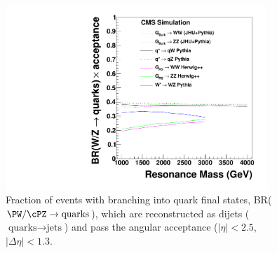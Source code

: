 
\begin{figure}[htb]
\begin{center}
\includegraphics[width=0.88\textwidth]{figs/signal-acc-eff/all-signal-acc-8TeV.pdf}
\end{center}
\caption{Fraction of events with branching into quark final states, BR($\PW/\cPZ \to \text{quarks}$),
  which are reconstructed as dijets ($\text{quarks} \to \text{jets}$)
  and pass the angular acceptance ($|\eta| < 2.5$, $|\Delta\eta|<1.3$.}
\label{fig:acceptances}
\end{figure}

